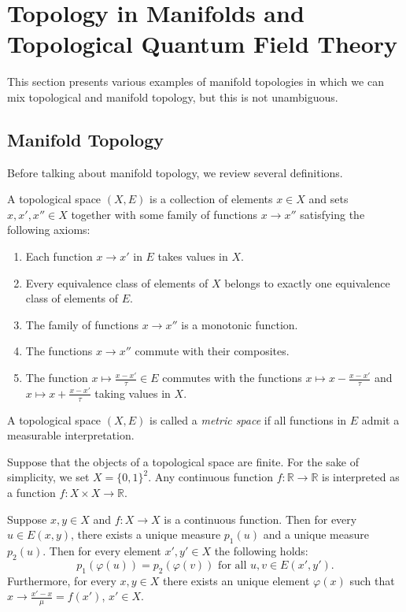 \documentclass[a4paper,reqno,oneside]{article}
\begin{document}
\section{Topology in Manifolds and Topological Quantum Field Theory} 

This section presents various examples of manifold topologies in which we can mix topological and manifold topology, but this is not unambiguous. 

\subsection{Manifold Topology}

Before talking about manifold topology, we review several definitions.

\begin{definition}
    A topological space $(X,E)$ is a collection of elements $x \in X$ and sets $x, x', x'' \in X$ together with some family of functions $x \to x''$ satisfying the following axioms:
    \begin{enumerate}[label=(\alph*)]
        \item Each function $x \to x'$ in $E$ takes values in $X$.
        \item Every equivalence class of elements of $X$ belongs to exactly one equivalence class of elements of $E$.
        \item The family of functions $x \to x''$ is a monotonic function.
        \item The functions $x \to x''$ commute with their composites.
        \item The function $x \mapsto \frac{x - x'}{\tau} \in E$ commutes with the functions $x \mapsto x - \frac{x - x'}{\tau}$ and $x \mapsto x + \frac{x - x'}{\tau}$ taking values in $X$. 
    \end{enumerate}
    A topological space $(X,E)$ is called a \emph{metric space} if all functions in $E$ admit a measurable interpretation.    
\end{definition}

Suppose that the objects of a topological space are finite. For the sake of simplicity, we set $X = \{0,1\}^2$. Any continuous function $f: \mathbb{R} \to \mathbb{R}$ is interpreted as a function $f: X \times X \to \mathbb{R}$.

\begin{lemma}
    Suppose $x, y \in X$ and $f: X \to X$ is a continuous function. Then for every $u \in E(x,y)$, there exists a unique measure $p_1(u)$ and a unique measure $p_2(u)$. Then for every element $x', y' \in X$ the following holds:
    \[ p_1(\varphi(u)) = p_2(\varphi(v)) \text{ for all } u, v \in E(x',y').\]
    Furthermore, for every $x, y \in X$ there exists an unique element $\varphi(x)$ such that $x \to \frac{x' - x}{\mu} = f(x')$, $x' \in X$.
\end{lemma}
\end{document}

